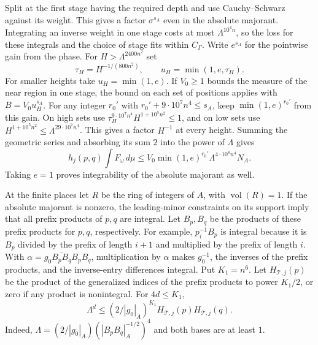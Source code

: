 Split at the first stage having the required depth and use
Cauchy--Schwarz against its weight. This gives a factor
\(\sigma^{s_A}\) even in the absolute majorant. Integrating an inverse
weight in one stage costs at most \(\Lambda^{10^4 n}\), so the loss
for these integrals and the choice of stage fits within \(C_\Gamma\).
Write \(e^{s_A}\) for the pointwise gain from the phase.
For \(H>\Lambda^{2400n^2}\) set
\[
 \tau_H=H^{-1/(800n^2)},\qquad
 u_H=\min(1,e,\tau_H).
\]
For smaller heights take \(u_H=\min(1,e)\).
If \(V_0\ge1\) bounds the measure of the near region in one stage, the
bound on each set of positions applies with \(B=V_0u_H^{s_A}\).
For any integer \(r_0'\) with \(r_0'+9\cdot10^7n^4\le s_A\), keep
\(\min(1,e)^{r_0'}\) from this gain. On high sets use
\(\tau_H^{9\cdot10^7n^4}H^{1+10^5n^2}\le1\), and on low sets use
\(H^{1+10^5n^2}\le\Lambda^{29\cdot10^7n^4}\).
This gives a factor \(H^{-1}\) at every height. Summing the geometric
series and absorbing its sum \(2\) into the power of \(\Lambda\) gives
\begin{equation}\label{eq:span-local-shell-total}
 h_j(p,q)\int F_\omega\,d\mu
 \le V_0\min(1,e)^{r_0'}\Lambda^{4\cdot10^8n^4}N_A .
\end{equation}
Taking \(e=1\) proves integrability of the absolute majorant as well.

At the finite places let \(R\) be the ring of integers of \(A\), with
\(\operatorname{vol}(R)=1\). If the absolute majorant is nonzero, the
leading-minor constraints on its support imply that all prefix
products of \(p,q\) are integral. Let \(B_p,B_q\) be the products
of these prefix products for \(p,q\), respectively.
For example, \(p_i^{-1}B_p\) is integral because it is \(B_p\) divided
by the prefix of length \(i+1\) and multiplied by the prefix of
length \(i\). With \(\alpha=g_0\overline{B_pB_q}B_pB_q\), multiplication
by \(\alpha\) makes \(g_0^{-1}\), the inverses of the prefix products,
and the inverse-entry differences integral.
Put \(K_1=n^6\). Let \(H_{\mathcal T,j}(p)\) be the product of the
generalized indices of the prefix products to power \(K_1/2\),
or zero if any product is nonintegral. For \(4d\le K_1\),
\begin{equation}\label{eq:span-local-gauge-payment}
 \Lambda^d\le(2/|g_0|_A)^{K_1}
                  H_{\mathcal T,j}(p)H_{\mathcal T,j}(q).
\end{equation}
Indeed, \(\Lambda=(2/|g_0|_A)(|B_pB_q|_A^{-1/2})^4\) and both
bases are at least \(1\).

